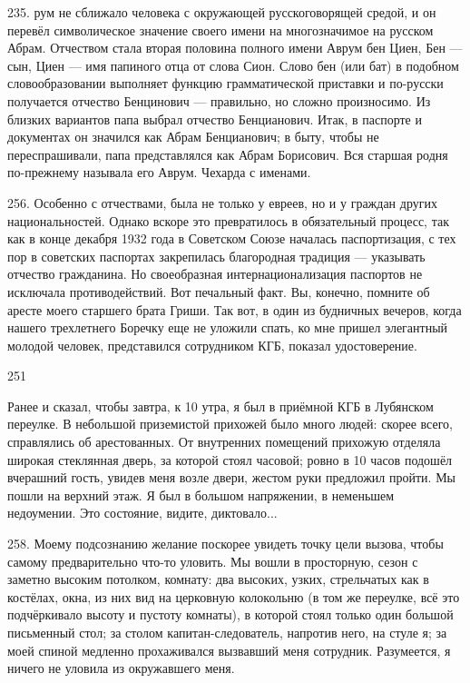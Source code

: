 235.
рум не сближало человека с окружающей русскоговорящей средой, и он перевёл символическое значение своего имени на многозначимое на русском Абрам. Отчеством стала вторая половина полного имени Аврум бен Циен, Бен — сын, Циен — имя папиного отца от слова Сион. Слово бен (или бат) в подобном словообразовании выполняет функцию грамматической приставки и по-русски получается отчество Бенцинович — правильно, но сложно произносимо. Из близких вариантов папа выбрал отчество Бенцианович.
Итак, в паспорте и документах он значился как Абрам Бенцианович; в быту, чтобы не переспрашивали, папа представлялся как Абрам Борисович. Вся старшая родня по-прежнему называла его Аврум. Чехарда с именами.

256. Особенно с отчествами, была не только у евреев, но и у граждан других национальностей. Однако вскоре это превратилось в обязательный процесс, так как в конце декабря 1932 года в Советском Союзе началась паспортизация, с тех пор в советских паспортах закрепилась благородная традиция — указывать отчество гражданина. Но своеобразная интернационализация паспортов не исключала противодействий. Вот печальный факт. Вы, конечно, помните об аресте моего старшего брата Гриши. Так вот, в один из будничных вечеров, когда нашего трехлетнего Боречку еще не уложили спать, ко мне пришел элегантный молодой человек, представился сотрудником КГБ, показал удостоверение.

251

Ранее и сказал, чтобы завтра, к 10 утра, я был в приёмной КГБ в Лубянском переулке. В небольшой приземистой прихожей было много людей: скорее всего, справлялись об арестованных. От внутренних помещений прихожую отделяла широкая стеклянная дверь, за которой стоял часовой; ровно в 10 часов подошёл вчерашний гость, увидев меня возле двери, жестом руки предложил пройти. Мы пошли на верхний этаж. Я был в большом напряжении, в неменьшем недоумении. Это состояние, видите, диктовало...

258.
Моему подсознанию желание поскорее увидеть точку цели вызова, чтобы самому предварительно что-то уловить. Мы вошли в просторную, сезон с заметно высоким потолком, комнату: два высоких, узких, стрельчатых как в костёлах, окна, из них вид на церковную колокольню (в том же переулке, всё это подчёркивало высоту и пустоту комнаты), в которой стоял только один большой письменный стол; за столом капитан-следователь, напротив него, на стуле я; за моей спиной медленно прохаживался вызвавший меня сотрудник. Разумеется, я ничего не уловила из окружавшего меня.

